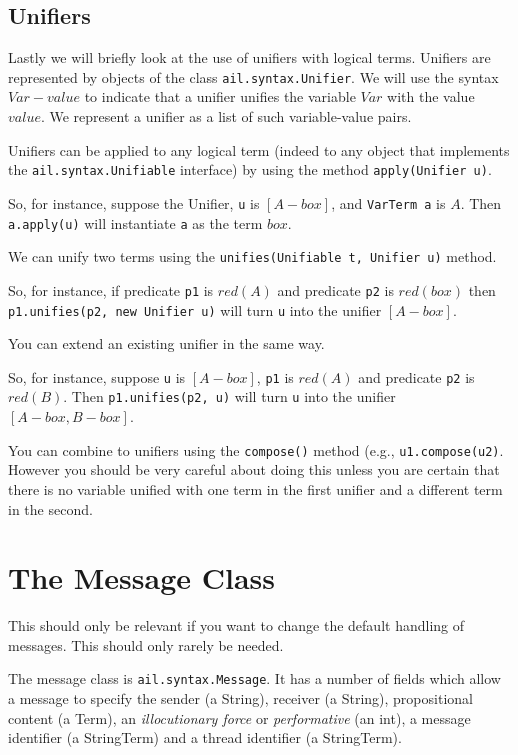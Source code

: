 \subsection{Unifiers}
Lastly we will briefly look at the use of unifiers with logical terms.  Unifiers are represented by objects of the class \texttt{ail.syntax.Unifier}.  We will use the syntax $Var-value$ to indicate that a unifier unifies the variable $Var$ with the value $value$.  We represent a unifier as a list of such variable-value pairs.
\begin{itemize}
\item Unifiers can be applied to any logical term (indeed to any object that implements the \texttt{ail.syntax.Unifiable} interface) by using the method \texttt{apply(Unifier u)}.

So, for instance, suppose the  Unifier, \texttt{u} is $[A-box]$, and \texttt{VarTerm a} is $A$. Then \texttt{a.apply(u)} will instantiate \texttt{a} as the term $box$.
\item We can unify two terms using the \texttt{unifies(Unifiable t, Unifier u)} method.

So, for instance, if predicate \texttt{p1} is $red(A)$ and predicate \texttt{p2} is $red(box)$ then \texttt{p1.unifies(p2, new Unifier u)} will turn \texttt{u} into the unifier $[A-box]$.
\item You can extend an existing unifier in the same way. 

So, for instance, suppose \texttt{u} is $[A-box]$, \texttt{p1} is $red(A)$ and predicate \texttt{p2} is $red(B)$.  Then \texttt{p1.unifies(p2, u)} will turn \texttt{u} into the unifier $[A-box, B-box]$.
\begin{sloppypar}
\item You can combine to unifiers using the \texttt{compose()} method (e.g., \texttt{u1.compose(u2)}.  However you should be very careful about doing this unless you are certain that there is no variable unified with one term in the first unifier and a different term in the second.
\end{sloppypar}
\end{itemize}

\section{The Message Class}
This should only be relevant if you want to change the default handling of messages.  This should only rarely be needed.

The message class is \texttt{ail.syntax.Message}.  It has a number of fields which allow a message to specify the sender (a String), receiver (a String), propositional content (a Term), an \emph{illocutionary force} or \emph{performative} (an int), a message identifier (a StringTerm) and a thread identifier (a StringTerm).

